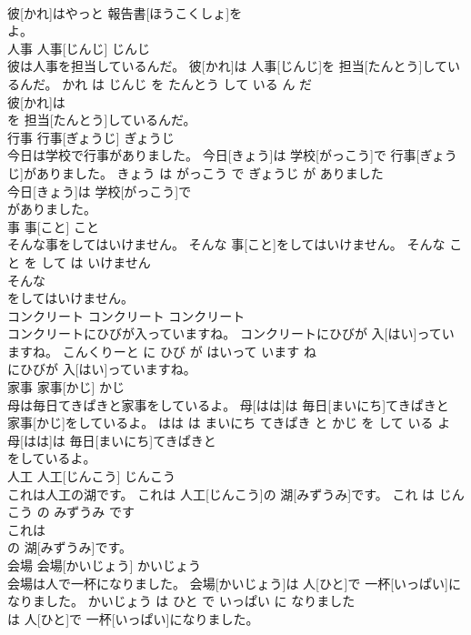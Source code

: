 \documentclass[8pt]{extreport}
\begin{document}
\begin{CJK}{UTF8}{min}
\\	彼[かれ]はやっと 報告書[ほうこくしょ]を
\\	よ。			
\\	人事	人事[じんじ]	じんじ	
\\	彼は人事を担当しているんだ。	彼[かれ]は 人事[じんじ]を 担当[たんとう]しているんだ。	かれ は じんじ を たんとう して いる ん だ	
\\	彼[かれ]は
\\	を 担当[たんとう]しているんだ。			
\\	行事	行事[ぎょうじ]	ぎょうじ	
\\	今日は学校で行事がありました。	今日[きょう]は 学校[がっこう]で 行事[ぎょうじ]がありました。	きょう は がっこう で ぎょうじ が ありました	
\\	今日[きょう]は 学校[がっこう]で
\\	がありました。			
\\	事	事[こと]	こと	
\\	そんな事をしてはいけません。	そんな 事[こと]をしてはいけません。	そんな こと を して は いけません	
\\	そんな
\\	をしてはいけません。			
\\	コンクリート	コンクリート	コンクリート	
\\	コンクリートにひびが入っていますね。	コンクリートにひびが 入[はい]っていますね。	こんくりーと に ひび が はいって います ね	
\\	にひびが 入[はい]っていますね。			
\\	家事	家事[かじ]	かじ	
\\	母は毎日てきぱきと家事をしているよ。	母[はは]は 毎日[まいにち]てきぱきと 家事[かじ]をしているよ。	はは は まいにち てきぱき と かじ を して いる よ	
\\	母[はは]は 毎日[まいにち]てきぱきと
\\	をしているよ。			
\\	人工	人工[じんこう]	じんこう	
\\	これは人工の湖です。	これは 人工[じんこう]の 湖[みずうみ]です。	これ は じんこう の みずうみ です	
\\	これは
\\	の 湖[みずうみ]です。			
\\	会場	会場[かいじょう]	かいじょう	
\\	会場は人で一杯になりました。	会場[かいじょう]は 人[ひと]で 一杯[いっぱい]になりました。	かいじょう は ひと で いっぱい に なりました	
\\	は 人[ひと]で 一杯[いっぱい]になりました。			

\end{CJK}
\end{document}
